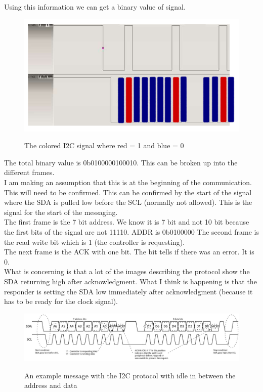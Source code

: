\documentclass[10pt,a4paper]{article}
\begin{document}
Using this information we can get a binary value of signal.
\begin{figure}[H]
\centering
\includegraphics[width=5in]{images/Problem1-colored.png} \\
\caption{The colored I2C signal where red = 1 and blue = 0}
\end{figure}
The total binary value is 0b0100000100010. This can be broken up into the different frames.\\
I am making an assumption that this is at the beginning of the communication. This will need to be confirmed. This can be confirmed by the start of the signal where the SDA is pulled low before the SCL (normally not allowed). This is the signal for the start of the messaging.\\
The first frame is the 7 bit address. We know it is 7 bit and not 10 bit because the first bits of the signal are not 11110.\cite{spark}
ADDR is 0b0100000
The second frame is the read write bit which is 1 (the controller is requesting). \\
The next frame is the ACK with one bit. The bit tells if there was an error. It is 0.\\

What is concerning is that a lot of the images describing the protocol show the SDA returning high after acknowledgment. What I think is happening is that the responder is setting the SDA low immediately after acknowledgment (because it has to be ready for the clock signal).\\

\begin{figure}[H]
\centering
\includegraphics[width=5in]{images/I2C_Basic_Address_and_Data_Frames.jpg} \\
\caption{An example message with the I2C protocol with idle in between the address and data\cite{spark}}
\end{figure}
\end{document}
